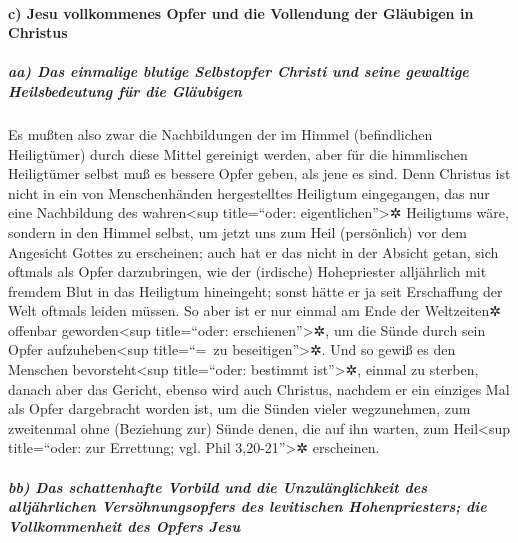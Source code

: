 \hypertarget{c-jesu-vollkommenes-opfer-und-die-vollendung-der-gluxe4ubigen-in-christus}{%
\paragraph{c) Jesu vollkommenes Opfer und die Vollendung der Gläubigen
in
Christus}\label{c-jesu-vollkommenes-opfer-und-die-vollendung-der-gluxe4ubigen-in-christus}}

\hypertarget{aa-das-einmalige-blutige-selbstopfer-christi-und-seine-gewaltige-heilsbedeutung-fuxfcr-die-gluxe4ubigen}{%
\subparagraph{aa) Das einmalige blutige Selbstopfer Christi und seine
gewaltige Heilsbedeutung für die
Gläubigen}\label{aa-das-einmalige-blutige-selbstopfer-christi-und-seine-gewaltige-heilsbedeutung-fuxfcr-die-gluxe4ubigen}}

 Es mußten also zwar die Nachbildungen der im Himmel
(befindlichen Heiligtümer) durch diese Mittel gereinigt werden, aber für
die himmlischen Heiligtümer selbst muß es bessere Opfer geben, als jene
es sind.  Denn Christus ist nicht in ein von
Menschenhänden hergestelltes Heiligtum eingegangen, das nur eine
Nachbildung des wahren\textless sup title=``oder:
eigentlichen''\textgreater✲ Heiligtums wäre, sondern in den Himmel
selbst, um jetzt uns zum Heil (persönlich) vor dem Angesicht Gottes zu
erscheinen;  auch hat er das nicht in der Absicht getan,
sich oftmals als Opfer darzubringen, wie der (irdische) Hohepriester
alljährlich mit fremdem Blut in das Heiligtum hineingeht;
 sonst hätte er ja seit Erschaffung der Welt oftmals
leiden müssen. So aber ist er nur einmal am Ende der Weltzeiten✲
offenbar geworden\textless sup title=``oder: erschienen''\textgreater✲,
um die Sünde durch sein Opfer aufzuheben\textless sup title=``=~zu
beseitigen''\textgreater✲.  Und so gewiß es den Menschen
bevorsteht\textless sup title=``oder: bestimmt ist''\textgreater✲,
einmal zu sterben, danach aber das Gericht,  ebenso wird
auch Christus, nachdem er ein einziges Mal als Opfer dargebracht worden
ist, um die Sünden vieler wegzunehmen, zum zweitenmal ohne (Beziehung
zur) Sünde denen, die auf ihn warten, zum Heil\textless sup
title=``oder: zur Errettung; vgl. Phil 3,20-21''\textgreater✲
erscheinen.

\hypertarget{bb-das-schattenhafte-vorbild-und-die-unzuluxe4nglichkeit-des-alljuxe4hrlichen-versuxf6hnungsopfers-des-levitischen-hohenpriesters-die-vollkommenheit-des-opfers-jesu}{%
\subparagraph{bb) Das schattenhafte Vorbild und die Unzulänglichkeit des
alljährlichen Versöhnungsopfers des levitischen Hohenpriesters; die
Vollkommenheit des Opfers
Jesu}\label{bb-das-schattenhafte-vorbild-und-die-unzuluxe4nglichkeit-des-alljuxe4hrlichen-versuxf6hnungsopfers-des-levitischen-hohenpriesters-die-vollkommenheit-des-opfers-jesu}}


